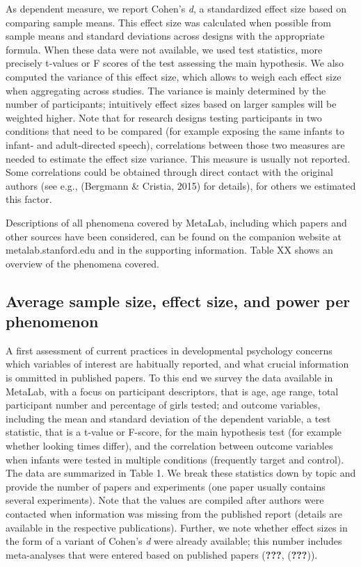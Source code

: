 \documentclass[english,floatsintext,man]{apa6}
\newcounter{author}
\begin{document}
As dependent measure, we report Cohen's \emph{d}, a standardized effect
size based on comparing sample means. This effect size was calculated
when possible from sample means and standard deviations across designs
with the appropriate formula. When these data were not available, we
used test statistics, more precisely t-values or F scores of the test
assessing the main hypothesis. We also computed the variance of this
effect size, which allows to weigh each effect size when aggregating
across studies. The variance is mainly determined by the number of
participants; intuitively effect sizes based on larger samples will be
weighted higher. Note that for research designs testing participants in
two conditions that need to be compared (for example exposing the same
infants to infant- and adult-directed speech), correlations between
those two measures are needed to estimate the effect size variance. This
measure is usually not reported. Some correlations could be obtained
through direct contact with the original authors (see e.g., (Bergmann \&
Cristia, 2015) for details), for others we estimated this factor.

Descriptions of all phenomena covered by MetaLab, including which papers
and other sources have been considered, can be found on the companion
website at metalab.stanford.edu and in the supporting information. Table
XX shows an overview of the phenomena covered.

\subsection{Average sample size, effect size, and power per
phenomenon}\label{average-sample-size-effect-size-and-power-per-phenomenon}

A first assessment of current practices in developmental psychology
concerns which variables of interest are habitually reported, and what
crucial information is ommitted in published papers. To this end we
survey the data available in MetaLab, with a focus on participant
descriptors, that is age, age range, total participant number and
percentage of girls tested; and outcome variables, including the mean
and standard deviation of the dependent variable, a test statistic, that
is a t-value or F-score, for the main hypothesis test (for example
whether looking times differ), and the correlation between outcome
variables when infants were tested in multiple conditions (frequently
target and control). The data are summarized in Table 1. We break these
statistics down by topic and provide the number of papers and
experiments (one paper usually contains several experiments). Note that
the values are compiled after authors were contacted when information
was missing from the published report (details are available in the
respective publications). Further, we note whether effect sizes in the
form of a variant of Cohen's \emph{d} were already available; this
number includes meta-analyses that were entered based on published
papers ({\textbf{???}}, ({\textbf{???}})).
\end{document}
